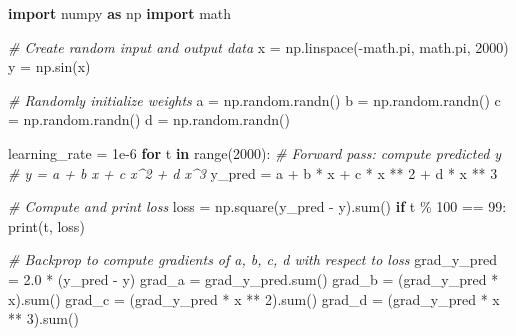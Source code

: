 \documentclass[
]{article}
\newenvironment{Shaded}{}{}
\newcommand{\BuiltInTok}[1]{\textcolor[rgb]{0.00,0.50,0.00}{#1}}
\newcommand{\CommentTok}[1]{\textcolor[rgb]{0.38,0.63,0.69}{\textit{#1}}}
\newcommand{\ControlFlowTok}[1]{\textcolor[rgb]{0.00,0.44,0.13}{\textbf{#1}}}
\newcommand{\DecValTok}[1]{\textcolor[rgb]{0.25,0.63,0.44}{#1}}
\newcommand{\FloatTok}[1]{\textcolor[rgb]{0.25,0.63,0.44}{#1}}
\newcommand{\ImportTok}[1]{\textcolor[rgb]{0.00,0.50,0.00}{\textbf{#1}}}
\newcommand{\KeywordTok}[1]{\textcolor[rgb]{0.00,0.44,0.13}{\textbf{#1}}}
\newcommand{\NormalTok}[1]{#1}
\newcommand{\OperatorTok}[1]{\textcolor[rgb]{0.40,0.40,0.40}{#1}}
\begin{document}
\begin{Shaded}
\begin{Highlighting}[]
\ImportTok{import}\NormalTok{ numpy }\ImportTok{as}\NormalTok{ np}
\ImportTok{import}\NormalTok{ math}

\CommentTok{\# Create random input and output data}
\NormalTok{x }\OperatorTok{=}\NormalTok{ np.linspace(}\OperatorTok{{-}}\NormalTok{math.pi, math.pi, }\DecValTok{2000}\NormalTok{)}
\NormalTok{y }\OperatorTok{=}\NormalTok{ np.sin(x)}

\CommentTok{\# Randomly initialize weights}
\NormalTok{a }\OperatorTok{=}\NormalTok{ np.random.randn()}
\NormalTok{b }\OperatorTok{=}\NormalTok{ np.random.randn()}
\NormalTok{c }\OperatorTok{=}\NormalTok{ np.random.randn()}
\NormalTok{d }\OperatorTok{=}\NormalTok{ np.random.randn()}

\NormalTok{learning\_rate }\OperatorTok{=} \FloatTok{1e{-}6}
\ControlFlowTok{for}\NormalTok{ t }\KeywordTok{in} \BuiltInTok{range}\NormalTok{(}\DecValTok{2000}\NormalTok{):}
    \CommentTok{\# Forward pass: compute predicted y}
    \CommentTok{\# y = a + b x + c x\^{}2 + d x\^{}3}
\NormalTok{    y\_pred }\OperatorTok{=}\NormalTok{ a }\OperatorTok{+}\NormalTok{ b }\OperatorTok{*}\NormalTok{ x }\OperatorTok{+}\NormalTok{ c }\OperatorTok{*}\NormalTok{ x }\OperatorTok{**} \DecValTok{2} \OperatorTok{+}\NormalTok{ d }\OperatorTok{*}\NormalTok{ x }\OperatorTok{**} \DecValTok{3}

    \CommentTok{\# Compute and print loss}
\NormalTok{    loss }\OperatorTok{=}\NormalTok{ np.square(y\_pred }\OperatorTok{{-}}\NormalTok{ y).}\BuiltInTok{sum}\NormalTok{()}
    \ControlFlowTok{if}\NormalTok{ t }\OperatorTok{\%} \DecValTok{100} \OperatorTok{==} \DecValTok{99}\NormalTok{:}
        \BuiltInTok{print}\NormalTok{(t, loss)}

    \CommentTok{\# Backprop to compute gradients of a, b, c, d with respect to loss}
\NormalTok{    grad\_y\_pred }\OperatorTok{=} \FloatTok{2.0} \OperatorTok{*}\NormalTok{ (y\_pred }\OperatorTok{{-}}\NormalTok{ y)}
\NormalTok{    grad\_a }\OperatorTok{=}\NormalTok{ grad\_y\_pred.}\BuiltInTok{sum}\NormalTok{()}
\NormalTok{    grad\_b }\OperatorTok{=}\NormalTok{ (grad\_y\_pred }\OperatorTok{*}\NormalTok{ x).}\BuiltInTok{sum}\NormalTok{()}
\NormalTok{    grad\_c }\OperatorTok{=}\NormalTok{ (grad\_y\_pred }\OperatorTok{*}\NormalTok{ x }\OperatorTok{**} \DecValTok{2}\NormalTok{).}\BuiltInTok{sum}\NormalTok{()}
\NormalTok{    grad\_d }\OperatorTok{=}\NormalTok{ (grad\_y\_pred }\OperatorTok{*}\NormalTok{ x }\OperatorTok{**} \DecValTok{3}\NormalTok{).}\BuiltInTok{sum}\NormalTok{()}


\end{Highlighting}
\end{Shaded}
\end{document}
